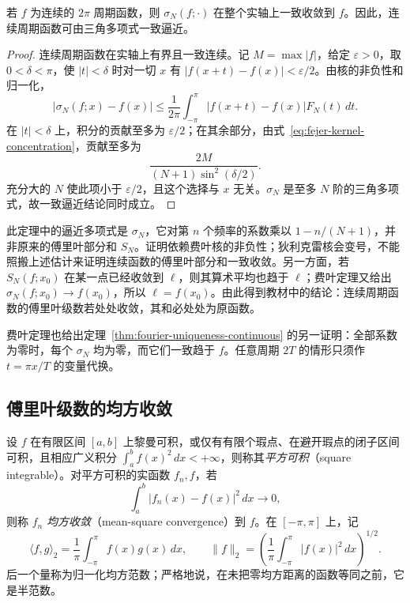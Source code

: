 \begin{theorem}[费叶定理与魏尔斯特拉斯第二逼近定理]
\label{thm:fejer-uniform-approximation}
若 $f$ 为连续的 $2\pi$ 周期函数，则 $\sigma_N(f;\cdot)$ 在整个实轴上一致收敛到 $f$。因此，连续周期函数可由三角多项式一致逼近。
\end{theorem}

\begin{proof}
连续周期函数在实轴上有界且一致连续。记 $M=\max|f|$，给定 $\varepsilon>0$，取 $0<\delta<\pi$，使 $|t|<\delta$ 时对一切 $x$ 有 $|f(x+t)-f(x)|<\varepsilon/2$。由核的非负性和归一化，
\[
    |\sigma_N(f;x)-f(x)|
       \leq\frac1{2\pi}\int_{-\pi}^{\pi}
                  |f(x+t)-f(x)|F_N(t)\,dt.
\]
在 $|t|<\delta$ 上，积分的贡献至多为 $\varepsilon/2$；在其余部分，由式~\eqref{eq:fejer-kernel-concentration}，贡献至多为
\[
    \frac{2M}{(N+1)\sin^2(\delta/2)}.
\]
充分大的 $N$ 使此项小于 $\varepsilon/2$，且这个选择与 $x$ 无关。$\sigma_N$ 是至多 $N$ 阶的三角多项式，故一致逼近结论同时成立。
\end{proof}

此定理中的逼近多项式是 $\sigma_N$，它对第 $n$ 个频率的系数乘以 $1-n/(N+1)$，并非原来的傅里叶部分和 $S_N$。证明依赖费叶核的非负性；狄利克雷核会变号，不能照搬上述估计来证明连续函数的傅里叶部分和一致收敛。另一方面，若 $S_N(f;x_0)$ 在某一点已经收敛到 $\ell$，则其算术平均也趋于 $\ell$；费叶定理又给出 $\sigma_N(f;x_0)\to f(x_0)$，所以 $\ell=f(x_0)$。由此得到教材中的结论：连续周期函数的傅里叶级数若处处收敛，其和必处处为原函数。

费叶定理也给出定理~\ref{thm:fourier-uniqueness-continuous} 的另一证明：全部系数为零时，每个 $\sigma_N$ 均为零，而它们一致趋于 $f$。任意周期 $2T$ 的情形只须作 $t=\pi x/T$ 的变量代换。

\subsection{傅里叶级数的均方收敛}
\label{subsec:mean-square-convergence-of-fourier-series}

\begin{definition}
\label{def:mean-square-convergence}
设 $f$ 在有限区间 $[a,b]$ 上黎曼可积，或仅有有限个瑕点、在避开瑕点的闭子区间可积，且相应广义积分 $\int_a^bf(x)^2\,dx<+\infty$，则称其\emph{平方可积}（square integrable）。对平方可积的实函数 $f_n,f$，若
\[
    \int_a^b|f_n(x)-f(x)|^2\,dx\longrightarrow0,
\]
则称 $f_n$ \emph{均方收敛}（mean-square convergence）到 $f$。在 $[-\pi,\pi]$ 上，记
\begin{equation}
    \langle f,g\rangle_2=\frac1\pi\int_{-\pi}^{\pi}f(x)g(x)\,dx,
    \qquad \|f\|_2=\left(\frac1\pi\int_{-\pi}^{\pi}|f(x)|^2\,dx\right)^{1/2}.
    \label{eq:normalized-square-integral}
\end{equation}
后一个量称为归一化均方范数；严格地说，在未把零均方距离的函数等同之前，它是半范数。
\end{definition}


